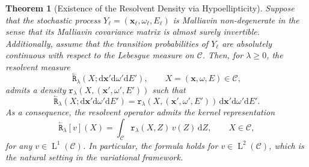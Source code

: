 \documentclass{amsart}
\newcommand{\dd}{{\mathrm d}}
\newcommand{\bR}{\stackrel{_\leftarrow}{\mathtt R}}
\newcommand{\rr}{{\mathtt r}}
\theoremstyle{plain}
\newtheorem{theorem}{Theorem}[section]
\renewcommand{\vec}[1]{\ensuremath{\boldsymbol{#1}}}
\newcommand{\leb}{\text{Leb}}
\newcommand{\LL}{\ensuremath{\operatorname L}\xspace}
\renewcommand{\leb}[1]{\ensuremath{\LL^{#1}}}
\begin{document}
\begin{theorem}[Existence of the Resolvent Density via Hypoellipticity]
  Suppose that the stochastic process $Y_\ell = (\vec{x}_\ell,
  \omega_\ell, E_\ell)$ is Malliavin non-degenerate in the sense that
  its Malliavin covariance matrix is almost surely
  invertible. Additionally, assume that the transition probabilities
  of $Y_\ell$ are absolutely continuous with respect to the Lebesgue
  measure on $\mathcal{C}$. Then, for $\lambda \geq 0$, the resolvent measure
  \begin{equation}
    \bR_\lambda(X; \dd \vec x' \dd \omega' \dd E'), \qquad X = (\vec x, \omega, E) \in \mathcal{C},
  \end{equation}
  admits a density $\rr_\lambda(X, (\vec x', \omega', E'))$ such that
  \begin{equation}
    \bR_\lambda(X; \dd \vec x' \dd \omega' \dd E') = 
    \rr_\lambda(X, (\vec x', \omega', E')) \, \dd \vec x' \dd \omega' \dd E'.
  \end{equation}
  As a consequence, the resolvent operator admits the kernel representation
  \begin{equation}
    \bR_\lambda[v](X) = \int_{\mathcal{C}} \rr_\lambda(X, Z) \, v(Z) \, \dd Z, \qquad X \in \mathcal{C}, 
  \end{equation}
  for any $v \in \leb{1}(\mathcal{C})$. In particular, the formula holds for $v \in \leb{2}(\mathcal{C})$, which is the natural setting in the variational framework.
\end{theorem}
\end{document}
